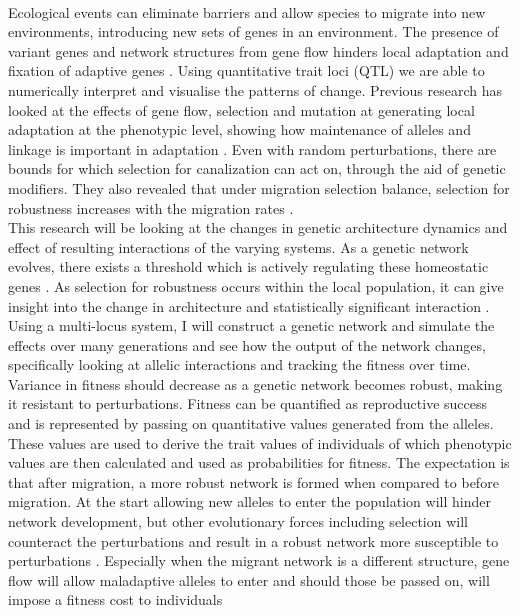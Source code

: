 \\Ecological events can eliminate barriers and allow species to migrate into new environments, introducing new sets of genes in an environment. The presence of variant genes and network structures from gene flow hinders local adaptation and fixation of adaptive genes \cite{burt1995evolution}. Using quantitative trait loci (QTL) we are able to numerically interpret and visualise the patterns of change. Previous research has looked at the effects of gene flow, selection and mutation at generating local adaptation at the phenotypic level, showing how maintenance of alleles and linkage is important in adaptation \cite{yeaman2011genetic}. Even with random perturbations, there are bounds for which selection for canalization can act on, through the aid of genetic modifiers. They also revealed that under migration selection balance, selection for robustness increases with the migration rates \cite{proulx2005opportunity}.
\\This research will be looking at the changes in genetic architecture dynamics and effect of resulting interactions of the varying systems. As a genetic network evolves, there exists a threshold which is actively regulating these homeostatic genes \cite{gjuvsland2007threshold}. As selection for robustness occurs within the local population, it can give insight into the change in architecture and statistically significant interaction \cite{gjuvsland2007statistical}. Using a multi-locus system, I will construct a genetic network and simulate the effects over many generations and see how the output of the network changes, specifically looking at allelic interactions and tracking the fitness over time. Variance in fitness should decrease as a genetic network becomes robust, making it resistant to perturbations. Fitness can be quantified as reproductive success and is represented by passing on quantitative values generated from the alleles. These values are used to derive the trait values of individuals of which phenotypic values are then calculated and used as probabilities for fitness. The expectation is that after migration, a more robust network is formed when compared to before migration. At the start allowing new alleles to enter the population will hinder network development, but other evolutionary forces including selection will counteract the perturbations and result in a robust network more susceptible to perturbations \cite{garcia1997genetic}. Especially when the migrant network is a different structure, gene flow will allow maladaptive alleles to enter and should those be passed on, will impose a fitness cost to individuals \cite{tigano2016genomics}
